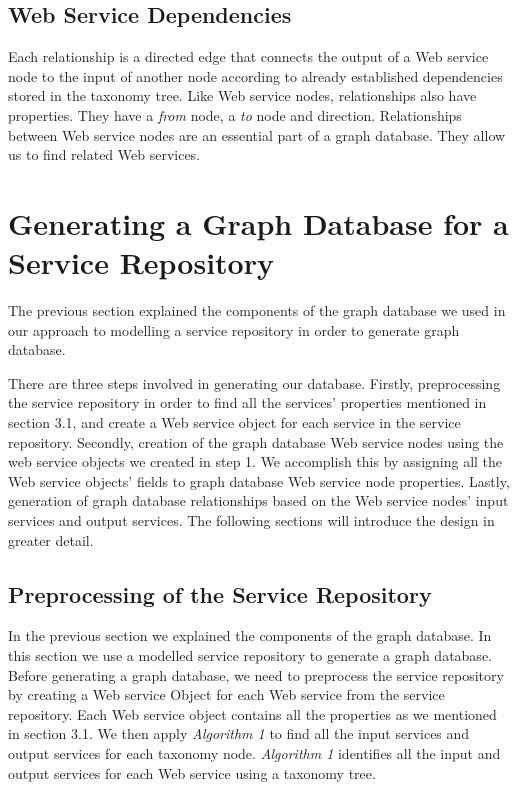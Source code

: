 \subsection {Web Service Dependencies}
Each relationship is a directed edge that connects the output of a Web service node to the input of another node according to already established dependencies stored in the taxonomy tree. Like Web service nodes, relationships also have properties. They have a \emph{from} node, a  \emph{to} node and direction. Relationships between Web service nodes are an essential part of a graph database. They allow us to find related Web services.  


\section {Generating a Graph Database for a Service Repository}

The previous section explained the components of the graph database we used in our approach to modelling a service repository in order to generate graph database.

There are three steps involved in generating our database. Firstly, preprocessing the service repository in order to find all the services' properties mentioned in section 3.1, and create a Web service object for each service in the service repository. Secondly, creation of the graph database Web service nodes using the web service objects we created in step 1. We accomplish this by assigning all the Web service objects' fields to graph database Web service node properties. Lastly, generation of graph database relationships based on the Web service nodes' input services and output services. The following sections will introduce the design in greater detail.   

\subsection{Preprocessing of the Service Repository}
In the previous section we explained the components of the graph database.  In this section we use a modelled service repository to generate a graph database.  Before generating a graph database, we need to preprocess the service repository by creating a Web service Object for each Web service from the service repository. Each Web service object contains all the properties as we mentioned in section 3.1. We then apply \emph{Algorithm 1} to find all the input services and output services for each taxonomy node. \emph{Algorithm 1} identifies all the input and output services for each Web service using a taxonomy tree. 




